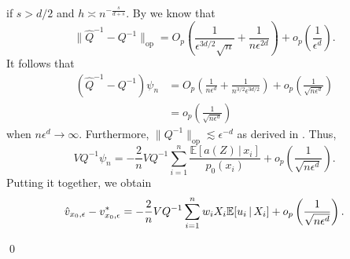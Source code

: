 \documentclass[11pt]{article}
\begin{document}
if $s > d/2$ and $h \asymp n^{-\frac{s}{d+s}}$. By  we know that 
\[\|\hat{Q}^{-1} - Q^{-1}\|_{\text{op}} = O_p\left(\frac{1}{\epsilon^{3d/2}\sqrt{n}} + \frac{1}{n\epsilon^{2d}}\right) + o_p\left(\frac{1}{\epsilon^d}\right).\]
It follows that 
\begin{align*}
    (\hat{Q}^{-1} - Q^{-1})\psi_n &= O_p\left(\frac{1}{n\epsilon^{d}} + \frac{1}{n^{3/2}\epsilon^{3d/2}}\right) + o_p\left(\frac{1}{\sqrt{n\epsilon^d}}\right) \\
    &= o_p\left(\frac{1}{\sqrt{n\epsilon^d}}\right)
\end{align*}
when $n\epsilon^d \rightarrow \infty$. Furthermore, $\|Q^{-1}\|_{\text{op}} \lesssim \epsilon^{-d}$ as derived in . Thus,
\[VQ^{-1}\psi_n = -\frac{2}{n}VQ^{-1}\sum_{i = 1}^n\frac{\mathbb{E}[a(Z)\,|\, x_i]}{p_0(x_i)} + o_p\left(\frac{1}{\sqrt{n\epsilon^d}}\right).\]
Putting it together, we obtain
\begin{equation}
    \hat{v}_{x_0, \epsilon} - v^*_{x_0, \epsilon} = -\frac{2}{n}VQ^{-1}\sum_{i = 1}^nw_iX_i\mathbb{E}[u_i\,|\,X_i] \\
    + o_p\left(\frac{1}{\sqrt{n\epsilon^{d}}}\right).
\end{equation}

\qed{}
\end{document}
